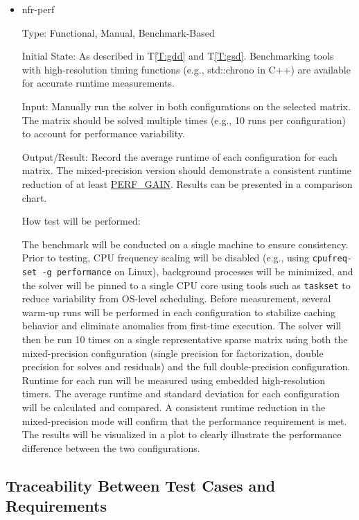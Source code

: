 \documentclass[12pt, titlepage]{article}
\newcounter{testnum} %
\newcommand{\tref}[1]{T\ref{#1}}
\begin{document}
\begin{itemize}

\item[T\refstepcounter{testnum}\thetestnum \label{T:perf}:]{nfr-perf}

Type: Functional, Manual, Benchmark-Based

Initial State: As described in \tref{T:gdd} and \tref{T:gsd}. Benchmarking tools
with high-resolution timing functions (e.g., std::chrono in C++) are available
for accurate runtime measurements.

Input: Manually run the solver in both configurations on the selected matrix.
The matrix should be solved multiple times (e.g., 10 runs per configuration) to
account for performance variability.

Output/Result: Record the average runtime of each configuration for each matrix.
The mixed-precision version should demonstrate a consistent runtime reduction of
at least \hyperref[tab:symbolic]{PERF\_GAIN}. Results can be presented in a
comparison chart.

How test will be performed:

The benchmark will be conducted on a single machine to ensure consistency. Prior
to testing, CPU frequency scaling will be disabled (e.g., using
\texttt{cpufreq-set -g performance} on Linux), background processes will be
minimized, and the solver will be pinned to a single CPU core using tools such
as \texttt{taskset} to reduce variability from OS-level scheduling. Before
measurement, several warm-up runs will be performed in each configuration to
stabilize caching behavior and eliminate anomalies from first-time execution.
The solver will then be run 10 times on a single representative sparse matrix
using both the mixed-precision configuration (single precision for
factorization, double precision for solves and residuals) and the full
double-precision configuration. Runtime for each run will be measured using
embedded high-resolution timers. The average runtime and standard deviation for
each configuration will be calculated and compared. A consistent runtime
reduction in the mixed-precision mode will confirm that the performance
requirement is met. The results will be visualized in a plot to clearly
illustrate the performance difference between the two configurations.

\end{itemize}

\subsection{Traceability Between Test Cases and Requirements}
\end{document}
